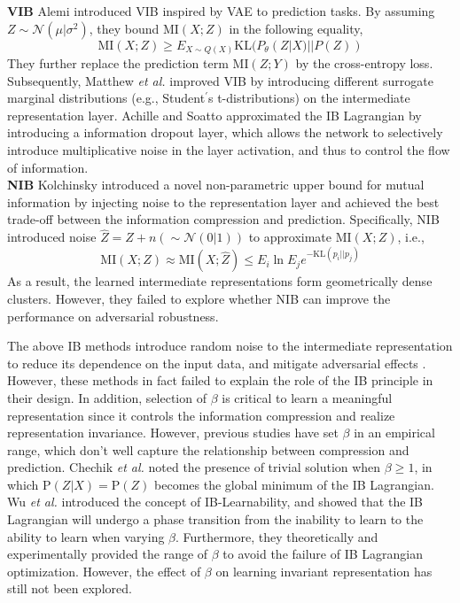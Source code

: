 \documentclass[10pt,journal,compsoc]{IEEEtran}
\begin{document}
\noindent \textbf{VIB} \quad Alemi \cite{Alemi2017DeepVI} introduced VIB inspired by VAE \cite{Kingma2014AutoEncodingVB} to prediction tasks. By assuming $Z \sim \mathcal{N}(\mu|\sigma^2)$, they bound $\mathrm{MI}(X; Z)$ in the following equality,
\begin{equation*}
\mathrm{MI}(X; Z) \geq E_{X \sim Q(X)} \mathrm{KL}(P_{\theta}(Z|X)||P(Z))
\label{eq:vib}
\end{equation*}
They further replace the prediction term $\mathrm{MI}(Z; Y)$ by the cross-entropy loss. Subsequently, Matthew \emph{et al.} \cite{chalk2016relevant} improved VIB by introducing different surrogate marginal distributions (e.g., Student$^{'}$s t-distributions) on the intermediate representation layer. Achille and Soatto \cite{Achille2018InformationDL} approximated the IB Lagrangian by introducing a information dropout layer, which allows the network to selectively introduce multiplicative noise in the layer activation, and thus to control the flow of information.\\

\noindent \textbf{NIB} \quad Kolchinsky \cite{Kolchinsky2019NonlinearIB} introduced a novel non-parametric upper bound for mutual information by injecting noise to the representation layer and achieved the best trade-off between the information compression and prediction. Specifically, NIB introduced noise $\hat{Z} = Z + n(\sim \mathcal{N}(0|1))$ to approximate $\mathrm{MI}(X; Z)$, i.e.,
\begin{equation*}
\mathrm{MI}(X; Z) \approx \mathrm{MI}(X;\hat{Z}) \leq E_{i}\ln E_{j}e^{-\mathrm{KL}(p_{i}||p_{j})}
\label{eq:nib}
\end{equation*}
As a result, the learned intermediate representations form geometrically dense clusters. However, they failed to explore whether NIB can improve the performance on adversarial robustness.


The above IB methods introduce random noise to the intermediate representation to reduce its dependence on the input data, and mitigate adversarial effects \cite{Amjad2020LearningRF,Gu2015TowardsDN,Rakin2019ParametricNI}. However, these methods in fact failed to explain the role of the IB principle in their design.
In addition, selection of $\beta$ is critical to learn a meaningful representation since it controls the information compression and realize representation invariance. However, previous studies have set $\beta$ in an empirical range, which don't well capture the relationship between compression and prediction. 
Chechik \emph{et al.} \cite{Chechik2003InformationBF} noted the presence of trivial solution when $\beta \geq 1$, in which $\mathrm{P}(Z|X) = \mathrm{P}(Z)$ becomes the global minimum of the IB Lagrangian.
Wu \emph{et al.} \cite{Wu2019LearnabilityFT} introduced the concept of IB-Learnability, and showed that the IB Lagrangian will undergo a phase transition from the inability to learn to the ability to learn when varying $\beta$. Furthermore, they theoretically and experimentally provided the range of $\beta$ to avoid the failure of IB Lagrangian optimization. However, the effect of $\beta$ on learning invariant representation has still not been explored.
\end{document}
